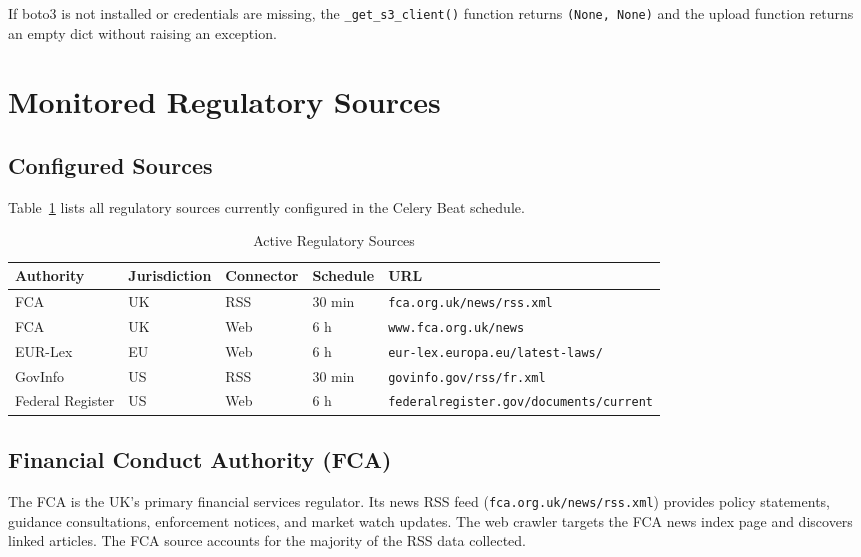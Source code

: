 \documentclass[12pt,a4paper]{article}
\begin{document}
If boto3 is not installed or credentials are missing, the \texttt{\_get\_s3\_client()} function returns \texttt{(None, None)} and the upload function returns an empty dict without raising an exception.

\section{Monitored Regulatory Sources}

\subsection{Configured Sources}

Table~\ref{tab:sources} lists all regulatory sources currently configured in the Celery Beat schedule.

\begin{table}[H]
\centering
\caption{Active Regulatory Sources}\label{tab:sources}
\begin{tabularx}{\textwidth}{@{}l l l l X@{}}
\toprule
\textbf{Authority} & \textbf{Jurisdiction} & \textbf{Connector} & \textbf{Schedule} & \textbf{URL} \\
\midrule
FCA           & UK       & RSS  & 30 min & \texttt{fca.org.uk/news/rss.xml} \\
FCA           & UK       & Web  & 6 h    & \texttt{www.fca.org.uk/news} \\
EUR-Lex       & EU       & Web  & 6 h    & \texttt{eur-lex.europa.eu/latest-laws/} \\
GovInfo       & US       & RSS  & 30 min & \texttt{govinfo.gov/rss/fr.xml} \\
Federal Register & US    & Web  & 6 h    & \texttt{federalregister.gov/documents/current} \\
\bottomrule
\end{tabularx}
\end{table}

\subsection{Financial Conduct Authority (FCA)}

The FCA is the UK's primary financial services regulator. Its news RSS feed (\texttt{fca.org.uk/news/rss.xml}) provides policy statements, guidance consultations, enforcement notices, and market watch updates. The web crawler targets the FCA news index page and discovers linked articles. The FCA source accounts for the majority of the RSS data collected.
\end{document}
